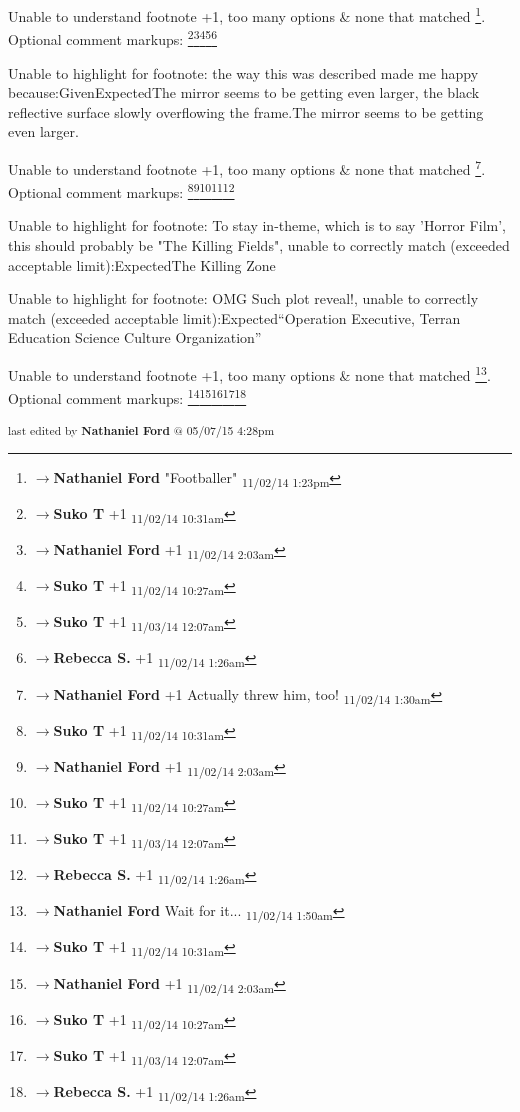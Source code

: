 	Unable to understand footnote +1, too many options & none that matched \footnote{$\rightarrow$\textbf{Nathaniel Ford }"Footballer" \textsubscript{11/02/14 1:23pm}}. Optional comment markups: \footnote{$\rightarrow$\textbf{Suko T }+1 \textsubscript{11/02/14 10:31am}}\footnote{$\rightarrow$\textbf{Nathaniel Ford }+1 \textsubscript{11/02/14 2:03am}}\footnote{$\rightarrow$\textbf{Suko T }+1 \textsubscript{11/02/14 10:27am}}\footnote{$\rightarrow$\textbf{Suko T }+1 \textsubscript{11/03/14 12:07am}}\footnote{$\rightarrow$\textbf{Rebecca S. }+1 \textsubscript{11/02/14 1:26am}} 

	Unable to highlight for footnote: the way this was described made me happy because:GivenExpectedThe mirror seems to be getting even larger, the black reflective surface slowly overflowing the frame.The mirror seems to be getting even larger.

	Unable to understand footnote +1, too many options & none that matched \footnote{$\rightarrow$\textbf{Nathaniel Ford }+1 Actually threw him, too! \textsubscript{11/02/14 1:30am}}. Optional comment markups: \footnote{$\rightarrow$\textbf{Suko T }+1 \textsubscript{11/02/14 10:31am}}\footnote{$\rightarrow$\textbf{Nathaniel Ford }+1 \textsubscript{11/02/14 2:03am}}\footnote{$\rightarrow$\textbf{Suko T }+1 \textsubscript{11/02/14 10:27am}}\footnote{$\rightarrow$\textbf{Suko T }+1 \textsubscript{11/03/14 12:07am}}\footnote{$\rightarrow$\textbf{Rebecca S. }+1 \textsubscript{11/02/14 1:26am}} 

	Unable to highlight for footnote: To stay in-theme, which is to say 'Horror Film', this should probably be "The Killing Fields", unable to correctly match (exceeded acceptable limit):ExpectedThe Killing Zone

	Unable to highlight for footnote: OMG
Such plot reveal!, unable to correctly match (exceeded acceptable limit):Expected“Operation Executive, Terran Education Science Culture Organization”

	Unable to understand footnote +1, too many options & none that matched \footnote{$\rightarrow$\textbf{Nathaniel Ford }Wait for it... \textsubscript{11/02/14 1:50am}}. Optional comment markups: \footnote{$\rightarrow$\textbf{Suko T }+1 \textsubscript{11/02/14 10:31am}}\footnote{$\rightarrow$\textbf{Nathaniel Ford }+1 \textsubscript{11/02/14 2:03am}}\footnote{$\rightarrow$\textbf{Suko T }+1 \textsubscript{11/02/14 10:27am}}\footnote{$\rightarrow$\textbf{Suko T }+1 \textsubscript{11/03/14 12:07am}}\footnote{$\rightarrow$\textbf{Rebecca S. }+1 \textsubscript{11/02/14 1:26am}} 


\fi

\vspace{\fill}

\begin{flushright}
\textsubscript{last edited by \textbf{Nathaniel Ford} @ 05/07/15 4:28pm}
\end{flushright}

